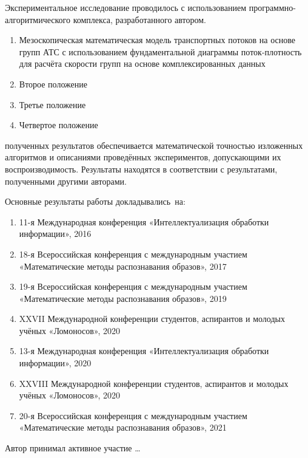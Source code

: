 {\methods} Экспериментальное исследование проводилось с использованием программно-алгоритмического комплекса, разработанного автором.

{}
\begin{enumerate}[beginpenalty=10000] %
  \item Мезоскопическая математическая модель транспортных потоков на основе групп АТС с использованием фундаментальной диаграммы поток-плотность для расчёта скорости групп на основе комплексированных данных
  \item Второе положение
  \item Третье положение
  \item Четвертое положение
\end{enumerate}


{\reliability} полученных результатов обеспечивается математической точностью изложенных алгоритмов и описаниями проведённых экспериментов, допускающими их воспроизводимость. 
Результаты находятся в соответствии с результатами, полученными другими авторами.


{\probation}
Основные результаты работы докладывались~на:
\begin{enumerate}
  \item 11-я Международная конференция «Интеллектуализация обработки информации», 2016
  \item 18-я Всероссийская конференция с международным участием «Математические методы распознавания образов», 2017
  \item 19-я Всероссийская конференция с международным участием «Математические методы распознавания образов», 2019
  \item XXVII Международной конференции студентов, аспирантов и молодых учёных «Ломоносов», 2020
  \item 13-я Международная конференция «Интеллектуализация обработки информации», 2020
  \item XXVIII Международной конференции студентов, аспирантов и молодых учёных «Ломоносов», 2020
  \item 20-я Всероссийская конференция с международным участием «Математические методы распознавания образов», 2021
\end{enumerate}

{\contribution} Автор принимал активное участие \ldots

